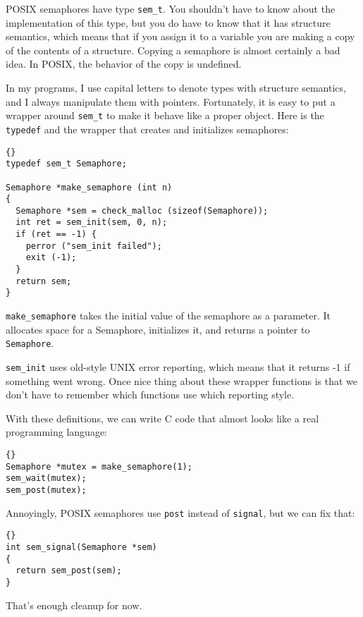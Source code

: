 \documentclass{book}
\begin{document}
POSIX semaphores have type {\tt sem\_t}.  You shouldn't have
to know about the implementation of this type, but you do
have to know that it has structure semantics, which means that
if you assign it to a variable you are making a copy of the
contents of a structure.  Copying a semaphore is almost certainly
a bad idea.  In POSIX, the behavior of the copy is undefined.

In my programs, I use capital letters to denote types with
structure semantics, and I always manipulate them with pointers.
Fortunately, it is easy to put a wrapper around {\tt sem\_t}
to make it behave like a proper object.  Here is the 
{\tt typedef} and the wrapper that creates and initializes
semaphores:

\begin{lstlisting}[title={}]{}
typedef sem_t Semaphore;

Semaphore *make_semaphore (int n)
{
  Semaphore *sem = check_malloc (sizeof(Semaphore));
  int ret = sem_init(sem, 0, n);
  if (ret == -1) {
    perror ("sem_init failed");
    exit (-1);    
  }
  return sem;
}
\end{lstlisting}

{\tt make\_semaphore} takes the initial value of the semaphore
as a parameter.  It allocates space for a Semaphore, initializes
it, and returns a pointer to {\tt Semaphore}.

{\tt sem\_init} uses old-style UNIX error reporting, which means
that it returns -1 if something went wrong.  Once nice thing
about these wrapper functions is that we don't have to remember
which functions use which reporting style.

With these definitions, we can write C code that almost looks
like a real programming language:

\begin{lstlisting}[title={}]{}
Semaphore *mutex = make_semaphore(1);
sem_wait(mutex);
sem_post(mutex);
\end{lstlisting}

Annoyingly, POSIX semaphores use {\tt post} instead of
{\tt signal}, but we can fix that:

\begin{lstlisting}[title={}]{}
int sem_signal(Semaphore *sem)
{
  return sem_post(sem);
}
\end{lstlisting}

That's enough cleanup for now.
\end{document}
